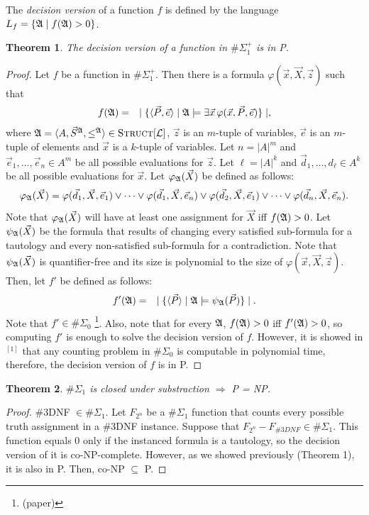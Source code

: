 \documentclass[12pt]{article}
\def\E1{\#\Sigma_1^{+}}
\def\Truc{\textsc{Struct}[\L]}
\def\A{{\frak A}}
\def\L{{\cal L}}
\def\P{\vec{P}}
\def\S{\vec{S}}
\def\X{\vec{X}}
\def\d{\vec{d}} %
\def\e{\vec{e}} %
\def\x{\vec{x}} %
\def\z{\vec{z}} %
\newtheorem{theo}{Theorem}
\begin{document}
The {\em decision version} of a function $f$ is defined by the language $L_f = \{\A \mid f(\A) > 0\}$.
\begin{theo}
The decision version of a function in $\E1$ is in \textsc{P}.
\end{theo}
\begin{proof}
Let $f$ be a function in $\E1$. Then there is a formula $\varphi(\x,\X,\z)$ such that
\begin{eqnarray*}
f(\A) &=& \mid \{ \langle\P,\e\rangle \mid \A \models \exists \x \, \varphi(\x,\P,\e) \} \mid,
\end{eqnarray*}
where $\A = \langle A, \S^{\A}, \leq^{\A} \rangle \in \Truc$, $\z$ is an $m$-tuple of variables, $\e$ is an $m$-tuple of elements and $\x$ is a $k$-tuple of variables. Let $n = \vert A \vert^m$ and $\e_1,\dots,\e_n \in A^m$ be all possible evaluations for $\z$. Let $\ell = \vert A \vert^k$ and $\d_1,\dots,d_\ell\in A^k$ be all possible evaluations for $\x$. Let $\varphi_\A(\X)$ be defined as follows:
\begin{eqnarray*}
\varphi_\A(\X) = \varphi(\d_1,\X,\e_1) \vee \cdots \vee \varphi(\d_1,\X,\e_n) \vee \varphi(\d_2,\X,\e_1) \vee \cdots \vee \varphi(\d_n,\X,\e_n).
\end{eqnarray*}
Note that $\varphi_\A(\X)$ will have at least one assignment for $\X$ iff $f(\A)>0$. Let $\psi_\A(\X)$ be the formula that results of changing every satisfied sub-formula for a tautology and every non-satisfied sub-formula for a contradiction. Note that $\psi_\A(\X)$ is quantifier-free and its size is polynomial to the size of $\varphi(\x,\X,\z)$. Then, let $f'$ be defined as follows:
\begin{eqnarray*}
f'(\A) &=& \mid \{ \langle\P\rangle \mid \A \models \psi_\A(\P) \} \mid.
\end{eqnarray*}
Note that $f' \in\#\Sigma_0$ \footnote[1]{(paper)}. Also, note that for every $\A$, $f(\A) > 0$ iff $f'(\A) > 0$, so computing $f'$ is enough to solve the decision version of $f$. However, it is showed in $^{[1]}$ that any counting problem in $\#\Sigma_0$ is computable in polynomial time, therefore, the decision version of $f$ is in P.
\end{proof}

\begin{theo}
$\#\Sigma_1$ is closed under substraction $\Rightarrow$ P = NP.
\end{theo}
\begin{proof}
\#3DNF $\in \#\Sigma_1$. Let $F_{2^n}$ be a $\#\Sigma_1$ function that counts every possible truth assignment in a \#3DNF instance. Suppose that $F_{2^n}-F_{\#3DNF} \in \#\Sigma_1$. This function equals 0 only if the instanced formula is a tautology, so the decision version of it is co-NP-complete. However, as we showed previously (Theorem 1), it is also in P. Then, co-NP $\subseteq$ P.
\end{proof}
\end{document}
